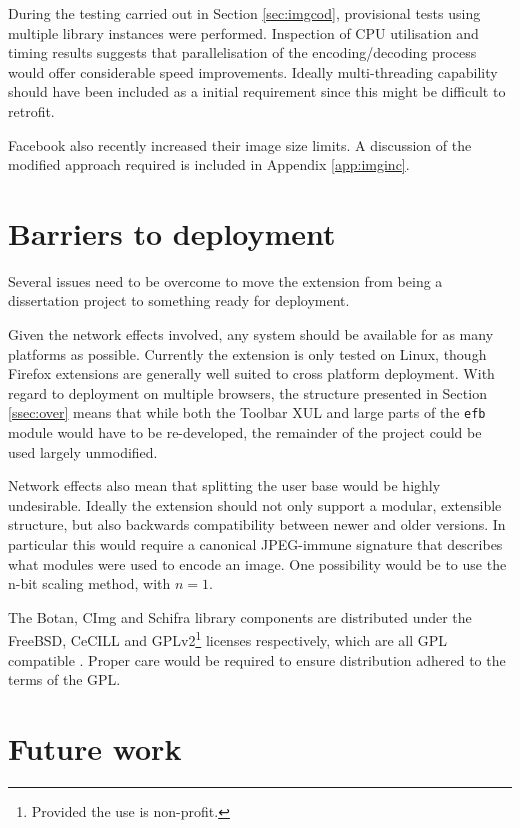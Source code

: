During the testing carried out in Section \ref{sec:imgcod}, provisional tests using multiple library instances were performed. Inspection of CPU utilisation and timing results suggests that parallelisation of the encoding/decoding process would offer considerable speed improvements. Ideally multi-threading capability should have been included as a initial requirement since this might be difficult to retrofit.

Facebook also recently increased their image size limits. A discussion of the modified approach required is included in Appendix \ref{app:imginc}.

\section{Barriers to deployment}
\label{sec:deploy}

Several issues need to be overcome to move the extension from being a dissertation project to something ready for deployment.

Given the network effects involved, any system should be available for as many platforms as possible. Currently the extension is only tested on Linux, though Firefox extensions are generally well suited to cross platform deployment. With regard to deployment on multiple browsers, the structure presented in Section \ref{ssec:over} means that while both the Toolbar XUL and large parts of the {\tt efb} module would have to be re-developed, the remainder of the project could be used largely unmodified.

Network effects also mean that splitting the user base would be highly undesirable. Ideally the extension should not only support a modular, extensible structure, but also backwards compatibility between newer and older versions. In particular this would require a canonical JPEG-immune signature that describes what modules were used to encode an image. One possibility would be to use the n-bit scaling method, with $n=1$.

The Botan, CImg and Schifra library components are distributed under the FreeBSD, CeCILL and GPLv2\footnote{Provided the use is non-profit.} licenses respectively, which are all GPL compatible \cite{gpl}. Proper care would be required to ensure distribution adhered to the terms of the GPL.


\section{Future work}
\label{sec:future}

